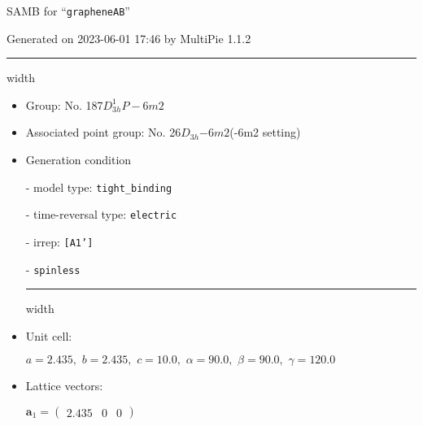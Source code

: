 \documentclass[fleqn,10pt,landscape]{article}
\begin{document}
\setcounter{MaxMatrixCols}{16}

\setlength{\baselineskip}{16pt}
\footnotesize
\begin{center}
\LARGE
SAMB for ``\texttt{grapheneAB}''
\end{center}
\begin{flushright}
Generated on 2023-06-01 17:46 by MultiPie 1.1.2
\end{flushright}
\vspace{1cm}


 \hfil \hrule height 1mm width \textwidth \hfil

\begin{itemize}
\item Group: No. 187\quad$D_{3h}^{1}$\quad$P-6m2$\quad[ hexagonal ]

\item Associated point group: No. 26\quad$D_{3h}$\quad$-6m2$\quad(-6m2 setting)\quad[ hexagonal ]

\vspace{5mm}

\item Generation condition

\quad - model type: \texttt{tight_binding}

\quad - time-reversal type: \texttt{electric}

\quad - irrep: \texttt{[A1']}

\quad - \texttt{spinless}


 \hfil \hrule height 1mm width \textwidth \hfil

\item Unit cell:

\quad $a=2.435,\,\, b=2.435,\,\, c=10.0,\,\, \alpha=90.0,\,\, \beta=90.0,\,\, \gamma=120.0$

\item Lattice vectors:

\quad $\bm{a}_1=\begin{pmatrix} 2.435 & 0 & 0 \end{pmatrix}$


\end{itemize}
\end{document}
